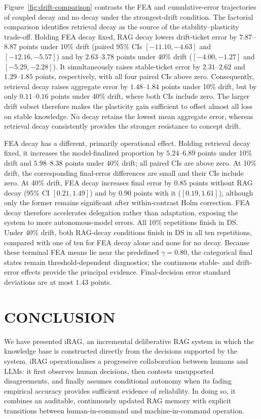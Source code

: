 \documentclass[a4paper,twoside]{article}
\begin{document}
Figure~\ref{fig:drift-comparison} contrasts the FEA and cumulative-error trajectories of coupled decay and no decay under the strongest-drift condition. The factorial comparison identifies retrieval decay as the source of the stability--plasticity trade-off. Holding FEA decay fixed, RAG decay lowers drift-ticket error by $7.87$--$8.87$ points under 10\% drift (paired 95\% CIs $[-11.10,-4.63]$ and $[-12.16,-5.57]$) and by $2.63$--$3.78$ points under 40\% drift ($[-4.00,-1.27]$ and $[-5.29,-2.28]$). It simultaneously raises stable-ticket error by $2.31$--$2.62$ and $1.29$--$1.85$ points, respectively, with all four paired CIs above zero. Consequently, retrieval decay raises aggregate error by $1.48$--$1.84$ points under 10\% drift, but by only $0.11$--$0.16$ points under 40\% drift, where both CIs include zero. The larger drift subset therefore makes the plasticity gain sufficient to offset almost all loss on stable knowledge. No decay retains the lowest mean aggregate error, whereas retrieval decay consistently provides the stronger resistance to concept drift.

FEA decay has a different, primarily operational effect. Holding retrieval decay fixed, it increases the model-finalized proportion by $5.24$--$6.89$ points under 10\% drift and $5.98$--$8.38$ points under 40\% drift; all paired CIs are above zero. At 10\% drift, the corresponding final-error differences are small and their CIs include zero. At 40\% drift, FEA decay increases final error by $0.85$ points without RAG decay (95\% CI $[0.21,1.49]$) and by $0.90$ points with it ($[0.19,1.61]$), although only the former remains significant after within-contrast Holm correction. FEA decay therefore accelerates delegation rather than adaptation, exposing the system to more autonomous-model errors. All 10\% repetitions finish in DS. Under 40\% drift, both RAG-decay conditions finish in DS in all ten repetitions, compared with one of ten for FEA decay alone and none for no decay. Because these terminal FEA means lie near the predefined $\gamma=0.80$, the categorical final states remain threshold-dependent diagnostics; the continuous stable- and drift-error effects provide the principal evidence. Final-decision error standard deviations are at most $1.43$ points.

\section{\uppercase{Conclusion}}
\label{sec:conclusion}
We have presented iRAG, an incremental deliberative RAG system in which the knowledge base is constructed directly from the decisions supported by the system. iRAG operationalises a progressive collaboration between humans and LLMs: it first observes human decisions, then contests unsupported disagreements, and finally assumes conditional autonomy when its fading empirical accuracy provides sufficient evidence of reliability. In doing so, it combines an auditable, continuously updated RAG memory with explicit transitions between human-in-command and machine-in-command operation.
\end{document}
